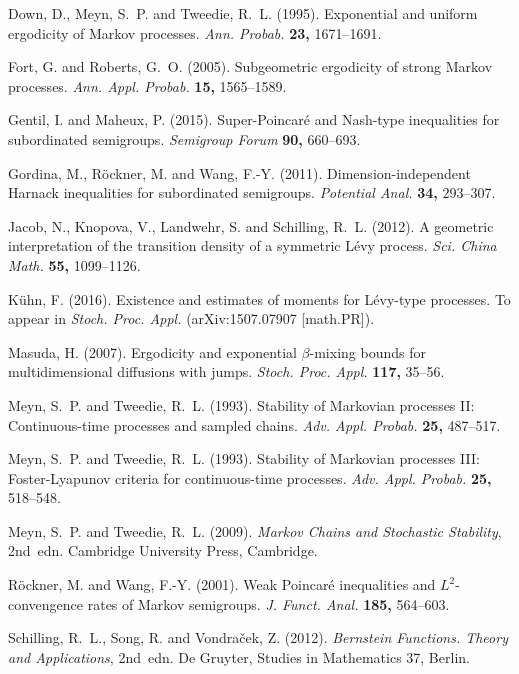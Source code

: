 \documentclass{aptpub}
\numberwithin{equation}{section}
\begin{document}
\begin{thebibliography}{99}
{\sc Down, D., Meyn, S.~P. and Tweedie, R.~L.} (1995).
Exponential and uniform ergodicity of Markov processes.
{\em Ann. Probab.} {\bf 23,} 1671--1691.

{\sc Fort, G. and Roberts, G.~O.} (2005).
Subgeometric ergodicity of strong Markov processes.
{\em Ann. Appl. Probab.} {\bf 15,} 1565--1589.

{\sc Gentil, I. and Maheux, P.} (2015).
Super-Poincar\'e and Nash-type inequalities for subordinated semigroups.
{\em Semigroup Forum} {\bf 90,} 660--693.

{\sc Gordina, M., R\"{o}ckner, M. and Wang, F.-Y.} (2011).
Dimension-independent Harnack inequalities for subordinated semigroups.
{\em Potential Anal.} {\bf 34,} 293--307.

{\sc Jacob, N., Knopova, V., Landwehr, S. and Schilling, R.~L.} (2012).
A geometric interpretation of the transition density of a symmetric L\'{e}vy process.
{\em Sci. China Math.} {\bf 55,} 1099--1126.

{\sc K\"uhn, F.} (2016).
Existence and estimates of moments for L\'evy-type processes.
To appear in {\em Stoch. Proc. Appl.} (arXiv:1507.07907 [math.PR]).

{\sc Masuda, H.} (2007).
Ergodicity and exponential $\beta$-mixing bounds for multidimensional diffusions with jumps. {\em Stoch. Proc. Appl.}
{\bf 117,} 35--56.

{\sc Meyn, S.~P. and Tweedie, R.~L.} (1993).
Stability of Markovian processes II: Continuous-time processes and sampled chains. {\em Adv. Appl. Probab.}
{\bf 25,} 487--517.

{\sc Meyn, S.~P. and Tweedie, R.~L.} (1993).
Stability of Markovian processes III: Foster-Lyapunov criteria for continuous-time processes. {\em Adv. Appl. Probab.}
{\bf 25,} 518--548.


{\sc Meyn, S.~P. and Tweedie, R.~L.} (2009).
{\em Markov Chains and Stochastic Stability}, 2nd~edn. Cambridge University Press, Cambridge.


{\sc R\"{o}ckner, M. and Wang, F.-Y.} (2001).
Weak Poincar\'{e} inequalities and $L^2$-convengence rates of Markov semigroups. {\em J. Funct. Anal.} {\bf 185,} 564--603.

{\sc Schilling, R.~L., Song, R. and Vondra\v{c}ek, Z.} (2012).
{\em Bernstein Functions. Theory and Applications}, 2nd~edn.
De Gruyter, Studies in Mathematics 37, Berlin.


\end{thebibliography}
\end{document}
